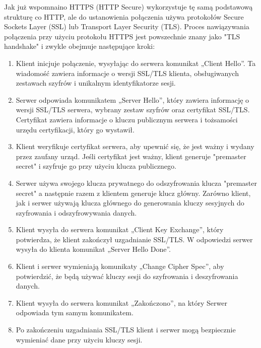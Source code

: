 \documentclass[12pt,twoside]{article}
\begin{document}
Jak już wspomnaino HTTPS (HTTP Secure) wykorzystuje tę samą podstawową strukturę co HTTP, ale do ustanowienia połączenia używa protokołów Secure Sockets Layer (SSL) lub Transport Layer Security (TLS). Proces nawiązywania połączenia przy użyciu protokołu HTTPS jest powszechnie znany jako "TLS handshake" i zwykle obejmuje następujące kroki:
\begin{enumerate}
    \item Klient inicjuje połączenie, wysyłając do serwera komunikat „Client Hello”. Ta wiadomość zawiera informacje o wersji SSL/TLS klienta, obsługiwanych zestawach szyfrów i unikalnym identyfikatorze sesji.
    \item Serwer odpowiada komunikatem „Server Hello”, który zawiera informację o wersji SSL/TLS serwera, wybrany zestaw szyfrów oraz certyfikat SSL/TLS. Certyfikat zawiera informacje o kluczu publicznym serwera i tożsamości urzędu certyfikacji, który go wystawił.
    \item Klient weryfikuje certyfikat serwera, aby upewnić się, że jest ważny i wydany przez zaufany urząd. Jeśli certyfikat jest ważny, klient generuje "premaster secret" i szyfruje go przy użyciu klucza publicznego.
    \item Serwer używa swojego klucza prywatnego do odszyfrowania klucza "premaster secret" a następnie razem z klientem generuje klucz główny. Zarówno klient, jak i serwer używają klucza głównego do generowania kluczy sesyjnych do szyfrowania i odszyfrowywania danych.

    \item Klient wysyła do serwera komunikat „Client Key Exchange”, który potwierdza, że klient zakończył uzgadnianie SSL/TLS. W odpowiedzi serwer wysyła do klienta komunikat „Server Hello Done”.

    \item Klient i serwer wymieniają komunikaty „Change Cipher Spec”, aby potwierdzić, że będą używać kluczy sesji do szyfrowania i deszyfrowania danych.
    \item Klient wysyła do serwera komunikat „Zakończono”, na który Serwer odpowiada tym samym komunikatem.
    \item Po zakończeniu uzgadniania SSL/TLS klient i serwer mogą bezpiecznie wymieniać dane przy użyciu kluczy sesji.
\end{enumerate}
\end{document}
